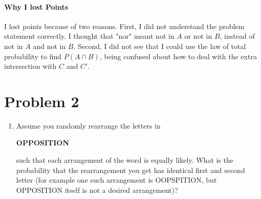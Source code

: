 ﻿\documentclass[12pt]{article}
\begin{document}
\begin{enumerate}[label=(\alph*), leftmargin=*]
\paragraph{Why I lost Points}\mbox{}
I lost points because of two reasons. First, I did not understand the problem statement correctly. I thought that "nor" meant not in $A$ or not in $B$, instead of not in $A$ and not in $B$. Second, I did not see that I could use the law of total probability to find $P(A\cap B)$, being confused about how to deal with the extra intersection with $C$ and $C'$.
\end{enumerate}

\section*{Problem 2}
\begin{enumerate}[label=(\alph*), leftmargin=*]
\item Assume you randomly rearrange the letters in
\begin{center}
\textbf{OPPOSITION}\\
\end{center}
such that each arrangement of the word is equally likely. What is the probability that the rearrangement you get has identical first and second letter (for example one such arrangement is OOPSPITION, but OPPOSITION itself is not a desired arrangement)?

\end{enumerate}
\end{document}

